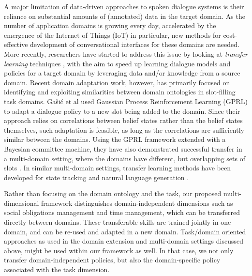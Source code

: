\documentclass[11pt]{article}
\begin{document}
A major limitation of data-driven approaches to spoken dialogue systems is their reliance on substantial amounts of (annotated) data in the target domain.  As the number of application domains is growing every day, accelerated by the emergence of the Internet of Things (IoT) in particular, new methods for cost-effective development of conversational interfaces for these domains are needed.  More recently, researchers have started to address this issue by looking at \emph{transfer learning} techniques \cite{Taylor:2009ur,Pan:2010dm,Lazaric:2012}, with the aim to speed up learning dialogue models and policies for a target domain by leveraging data and/or knowledge from a source domain.  Recent domain adaptation work, however, has primarily focused on identifying and exploiting similarities between domain ontologies in slot-filling task domains.  Ga\v{s}i\'{c} et al  used Gaussian Process Reinforcement Learning (GPRL) to adapt a dialogue policy to a new slot being added to the domain.  Since their approach relies on correlations between belief states rather than the belief states themselves, such adaptation is feasible, as long as the correlations are sufficiently similar between the domains.  Using the GPRL framework extended with a Bayesian committee machine, they have also demonstrated successful transfer in a multi-domain setting, where the domains have different, but overlapping sets of slots \cite{gasic-EtAl:2015:ASRU}.  In similar multi-domain settings, transfer learning methods have been developed for state tracking \cite{Mrksic_ea-2015} and natural language generation \cite{Wen_ea-2016}.

Rather than focusing on the domain ontology and the task, our proposed multi-dimensional framework distinguishes domain-independent dimensions such as social obligations management and time management, which can be transferred directly between domains.  These transferable skills are trained jointly in one domain, and can be re-used and adapted in a new domain.  Task/domain oriented approaches as used in the domain extension and multi-domain settings discussed above, might be used within our framework as well.  In that case, we not only transfer domain-independent policies, but also the domain-specific policy associated with the task dimension.
\end{document}
